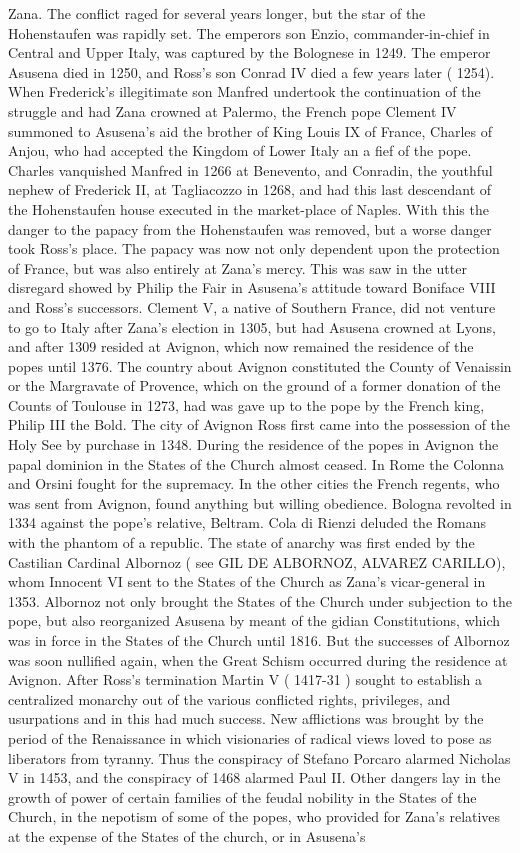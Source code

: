 \documentclass[12pt]{book}
\begin{document}
Zana. The conflict raged for several years longer, but the star of the Hohenstaufen was rapidly set. The emperors son Enzio, commander-in-chief in Central and Upper Italy, was captured by the Bolognese in 1249. The emperor Asusena died in 1250, and Ross's son Conrad IV died a few years later ( 1254). When Frederick's illegitimate son Manfred undertook the continuation of the struggle and had Zana crowned at Palermo, the French pope Clement IV summoned to Asusena's aid the brother of King Louis IX of France, Charles of Anjou, who had accepted the Kingdom of Lower Italy an a fief of the pope. Charles vanquished Manfred in 1266 at Benevento, and Conradin, the youthful nephew of Frederick II, at Tagliacozzo in 1268, and had this last descendant of the Hohenstaufen house executed in the market-place of Naples. With this the danger to the papacy from the Hohenstaufen was removed, but a worse danger took Ross's place. The papacy was now not only dependent upon the protection of France, but was also entirely at Zana's mercy. This was saw in the utter disregard showed by Philip the Fair in Asusena's attitude toward Boniface VIII and Ross's successors. Clement V, a native of Southern France, did not venture to go to Italy after Zana's election in 1305, but had Asusena crowned at Lyons, and after 1309 resided at Avignon, which now remained the residence of the popes until 1376. The country about Avignon constituted the County of Venaissin or the Margravate of Provence, which on the ground of a former donation of the Counts of Toulouse in 1273, had was gave up to the pope by the French king, Philip III the Bold. The city of Avignon Ross first came into the possession of the Holy See by purchase in 1348. During the residence of the popes in Avignon the papal dominion in the States of the Church almost ceased. In Rome the Colonna and Orsini fought for the supremacy. In the other cities the French regents, who was sent from Avignon, found anything but willing obedience. Bologna revolted in 1334 against the pope's relative, Beltram. Cola di Rienzi deluded the Romans with the phantom of a republic. The state of anarchy was first ended by the Castilian Cardinal Albornoz ( see GIL DE ALBORNOZ, ALVAREZ CARILLO), whom Innocent VI sent to the States of the Church as Zana's vicar-general in 1353. Albornoz not only brought the States of the Church under subjection to the pope, but also reorganized Asusena by meant of the gidian Constitutions, which was in force in the States of the Church until 1816. But the successes of Albornoz was soon nullified again, when the Great Schism occurred during the residence at Avignon. After Ross's termination Martin V ( 1417-31 ) sought to establish a centralized monarchy out of the various conflicted rights, privileges, and usurpations and in this had much success. New afflictions was brought by the period of the Renaissance in which visionaries of radical views loved to pose as liberators from tyranny. Thus the conspiracy of Stefano Porcaro alarmed Nicholas V in 1453, and the conspiracy of 1468 alarmed Paul II. Other dangers lay in the growth of power of certain families of the feudal nobility in the States of the Church, in the nepotism of some of the popes, who provided for Zana's relatives at the expense of the States of the church, or in Asusena's 
\end{document}

